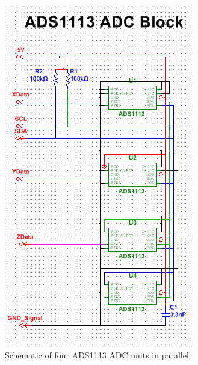 \begin{figure}[h]
\centering
\includegraphics[width=\textwidth,height=\textheight,keepaspectratio]{./KIRBY_Images/Multisim_4ADC}
\caption{Schematic of four ADS1113 ADC units in parallel}
\label{fig:Schematic_ADS1113}
\end{figure}

